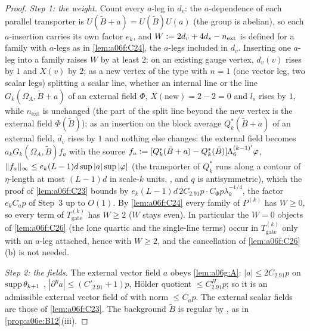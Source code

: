 \begin{proof}
\emph{Step 1: the weight.} Count every $a$-leg in $d_v$: the $a$-dependence of each parallel transporter is $U(\tilde B+a)=U(\tilde B)U(a)$ (the group is abelian), so each $a$-insertion carries its own factor $e_k$, and $W:=2d_v+4d_s-n_{\mathrm{ext}}$ is defined for a family with $a$-legs as in \cref{lem:a06f:C24}, the $a$-legs included in $d_v$. Inserting one $a$-leg into a family raises $W$ by at least $2$: on an existing gauge vertex, $d_v(v)$ rises by $1$ and $X(v)$ by $2$; as a new vertex of the type \cite[(1.8)]{Ba3} with $n=1$ (one vector leg, two scalar legs) splitting a scalar line, whether an internal line or the line $G_k(\Omega_A,\tilde B+a)$ of an external field $\Phi$, $X(\text{new})=2-2=0$ and $l_s$ rises by $1$, while $n_{\mathrm{ext}}$ is unchanged (the part of the split line beyond the new vertex is the external field $\Phi(\tilde B)$); as an insertion on the block average $Q_k^*(\tilde B+a)$ of an external field, $d_v$ rises by $1$ and nothing else changes: the external field becomes $a_kG_k(\Omega_A,\tilde B)f_a$ with the source $f_a:=[Q_k^*(\tilde B+a)-Q_k^*(\tilde B)]\Lambda^{(k-1)'}_6\varphi$, $\lVert f_a\rVert_\infty\le e_k(L-1)d\sup|a|\sup|\varphi|$ (the transporter of $Q_k^*$ runs along a contour of $\eta$-length at most $(L-1)d$ in scale-$k$ units, \cite[p.~559]{Ba2}, and $q$ is antisymmetric), which the proof of \cref{lem:a06f:C23} bounds by $e_k(L-1)d\,2C_{2.91}p\cdot C_\Phi p\lambda_k^{-1/4}$, the factor $e_kC_ap$ of Step~3 up to $O(1)$. By \cref{lem:a06f:C24} every family of $P^{(k)}$ has $W\ge0$, so every term of $T^{(k)}_{\mathrm{gate}}$ has $W\ge2$ ($W$ stays even). In particular the $W=0$ objects of \cref{lem:a06f:C26} (the lone quartic and the single-line terms) occur in $T^{(k)}_{\mathrm{gate}}$ only with an $a$-leg attached, hence with $W\ge2$, and the cancellation of \cref{lem:a06f:C26}(b) is not needed.

\emph{Step 2: the fields.} The external vector field $a$ obeys \cref{lem:a06g:A}: $|a|\le2C_{2.91}p$ on $\operatorname{supp}\theta_{k+1}$ \cite[(2.90)--(2.91)]{Ba2}, $|\partial^\eta a|\le(C'_{2.91}+1)p$, H\"older quotient $\le C^H_{2.91}p$; so it is an admissible external vector field of \cite[p.~412]{Ba3} with norm $\le C_ap$. The external scalar fields are those of \cref{lem:a06f:C23}. The background $\tilde B$ is regular by \cite[(2.94)--(2.98)]{Ba2}, as in \cref{prop:a06e:B12}(iii).


\end{proof}
